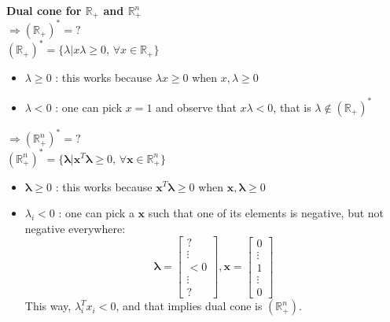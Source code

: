 \begin{example}
\begin{leftbar}
\textbf{Dual cone for $\mathbb{R}_+$ and $\mathbb{R}_+^n$}\\

$\Rightarrow(\mathbb{R}_+)^*=?$\\
$(\mathbb{R}_+)^*=\{\lambda | x \lambda \geq 0\textrm{, } \forall x \in \mathbb{R}_+ \}$
\begin{itemize}
\item $\lambda \geq 0$ : this works because $\lambda x \geq 0$ when $x,\lambda \geq 0$
\item $\lambda < 0$ : one can pick $x=1$ and observe that $x \lambda<0$, that is $\lambda \notin (\mathbb{R}_+)^*$
\end{itemize}

$\Rightarrow(\mathbb{R}_{+}^n)^*=?$\\
$(\mathbb{R}^n_+)^*=\{\boldsymbol{\lambda} | \boldsymbol{x}^T \boldsymbol{\lambda} \geq 0\textrm{, } \forall \boldsymbol{x} \in \mathbb{R}^n_+ \}$
\begin{itemize}
\item $\boldsymbol{\lambda} \geq 0$ : this works because $\boldsymbol{x}^T \boldsymbol{\lambda} \geq 0$ when $\boldsymbol{x},\boldsymbol{\lambda} \geq 0$
\item $\lambda_i < 0$ : one can pick a $\boldsymbol{x}$ such that one of its elements is negative, but not negative everywhere: 
\[\boldsymbol{\lambda}=\begin{bmatrix}
 ?\\
 \vdots\\
 <0\\
 \vdots\\
 ?
\end{bmatrix},\boldsymbol{x}=\begin{bmatrix}
 0\\
 \vdots\\
 1\\
 \vdots\\
 0
\end{bmatrix}\]
This way, $\lambda_i^T x_i < 0$, and that implies dual cone is $(\mathbb{R}_{+}^n)$.
\end{itemize}

\end{leftbar}
\end{example}

